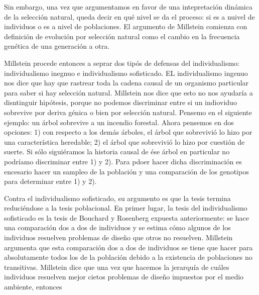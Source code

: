 Sin embargo, una vez que argumentamos en favor de una intepretación dinámica de la selección natural, queda decir en qué nivel se da el proceso: si es a nuivel de individuos o es a nivel de poblaciones. El argumento de Millstein comienza con definición de evolución por selección natural como el cambio en la frecuencia genética de una generación a otra.

Millstein procede entonces a seprar dos tipós de defensas del individualismo: individualismo inegnuo e individualismo sofisticado. EL individualismo ingenuo nos dice que hay que rastrear toda la cadena causal de un organismo particular para saber si hay selección natural. Millstein nos dice que esto no nos ayudaría a disntinguir hipótesis, porque no podemos discriminar entre si un indioviduo sobrevive por deriva génica o bien por selección natural. Pensemo en el siguiente ejemplo: un árbol sobrevive a un incendio forestal. Ahora pensemos en dos opciones: 1) con respecto a los demás árboles, el árbol que sobrevivió lo hizo por una característica heredable; 2) el árbol que sobrevivió lo hizo por cuestión de suerte. Si sólo siguiéramos la historia causal de ése árbol en particular no podríamo discriminar entre 1) y 2). Para pdoer hacer dicha discriminación es encesario hacer un sampleo de la población y una comparación de los genotipos para determinar entre 1) y 2).

Contra el individualismo sofisticado, su argumento es que la tesis termina reduciéndose a la tesis poblacional. En primer lugar, la tesis del individualismo sofisticado es la tesis de Bouchard y Rosenberg expuesta anteriormente: se hace una comparación dos a dos de individuos y se estima cómo algunos de los individuos resuelven problemas de diseño que otros no resuelven. Millstein argumenta que esta comparación dos a dos de individuos se tiene que hacer para absolutamente todos los de la población debido a la existencia de poblaciones no transitivas. Millstein dice que una vez que hacemos la jerarquía de cuáles individuos resuelven mejor cietos problemas de diseño impuestos por el medio ambiente, entonces





